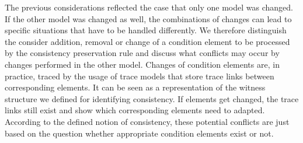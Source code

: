 The previous considerations reflected the case that only one model was changed.
If the other model was changed as well, the combinations of changes can lead to specific situations that have to be handled differently.
We therefore distinguish the consider addition, removal or change of a condition element to be processed by the consistency preservation rule and discuss what conflicts may occur by changes performed in the other model.
Changes of condition elements are, in practice, traced by the usage of trace models that store trace links between corresponding elements.
It can be seen as a representation of the witness structure we defined for identifying consistency.
If elements get changed, the trace links still exist and show which corresponding elements need to adapted.
According to the defined notion of consistency, these potential conflicts are just based on the question whether appropriate condition elements exist or not.
